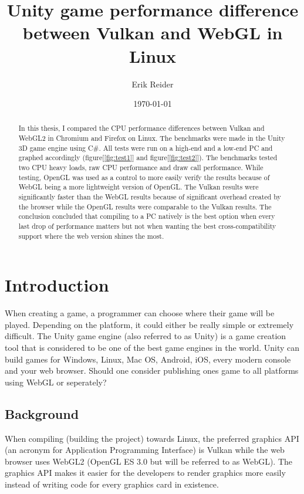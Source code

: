 \documentclass{article}
\title{Unity game performance difference between Vulkan and WebGL in Linux}
\author{Erik Reider}
\date{\today}
\begin{document}
\maketitle
\newpage

\begin{abstract}
In this thesis, I compared the CPU performance differences between Vulkan and WebGL2 in Chromium and Firefox on Linux. The benchmarks were made in the Unity 3D game engine using C\#. All tests were run on a high-end and a low-end PC and graphed accordingly (figure[\ref{fig:test1}] and figure[\ref{fig:test2}]). The benchmarks tested two CPU heavy loads, raw CPU performance and draw call performance. While testing, OpenGL was used as a control to more easily verify the results because of WebGL being a more lightweight version of OpenGL. The Vulkan results were significantly faster than the WebGL results because of significant overhead created by the browser while the OpenGL results were comparable to the Vulkan results. The conclusion concluded that compiling to a PC natively is the best option when every last drop of performance matters but not when wanting the best cross-compatibility support where the web version shines the most.
\end{abstract}

\newpage


\tableofcontents
\newpage


\section {Introduction}
When creating a game, a programmer can choose where their game will be played. Depending on the platform, it could either be really simple or extremely difficult. The Unity game engine (also referred to as Unity) is a game creation tool that is considered to be one of the best game engines in the world. Unity can build games for Windows, Linux, Mac OS, Android, iOS, every modern console and your web browser. Should one consider publishing ones game to all platforms using WebGL or seperately?

\subsection {Background}

When compiling (building the project) towards Linux, the preferred graphics API (an acronym for Application Programming Interface) is Vulkan while the web browser uses WebGL2 (OpenGL ES 3.0 but will be referred to as WebGL). The graphics API makes it easier for the developers to render graphics more easily instead of writing code for every graphics card in existence\cite{APIWiki}.
\end{document}
